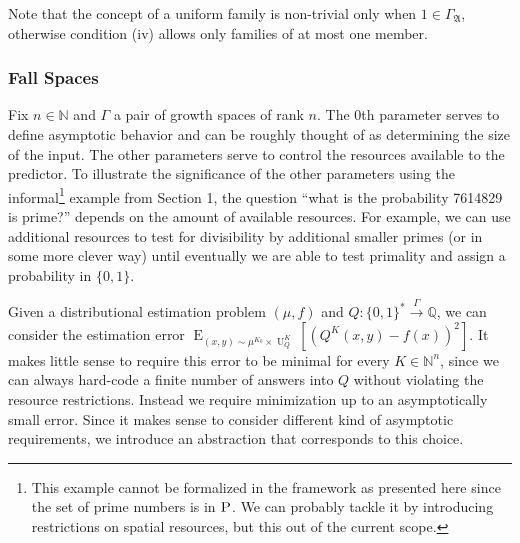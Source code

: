 \documentclass{article}
\numberwithin{equation}{section}
\theoremstyle{definition}
\theoremstyle{plain}
\newcommand{\Bool}{\{0,1\}}
\newcommand{\Words}{{\Bool^*}}
\DeclareMathOperator{\E}{E}
\DeclareMathOperator{\Un}{U}
\newcommand{\Nats}{\mathbb{N}}
\newcommand{\Rats}{\mathbb{Q}}
\newcommand{\GrowA}{\Gamma_{\mathfrak{A}}}
\newcommand{\Scheme}{\xrightarrow{\Gamma}}
\begin{document}
Note that the concept of a uniform family is non-trivial only when $1 \in \GrowA$, otherwise condition (iv) allows only families of at most one member.

\subsubsection{Fall Spaces}

Fix $n \in \Nats$ and $\Gamma$ a pair of growth spaces of rank $n$. The 0th parameter serves to define asymptotic behavior and can be roughly thought of as determining the size of the input. The other parameters serve to control the resources available to the predictor. To illustrate the significance of the other parameters using the informal\footnote{This example cannot be formalized in the framework as presented here since the set of prime numbers is in $\textsc{P}$. We can probably tackle it by introducing restrictions on spatial resources, but this out of the current scope.} example from Section 1, the question \enquote{what is the probability 7614829 is prime?} depends on the amount of available resources. For example, we can use additional resources to test for divisibility by additional smaller primes (or in some more clever way) until eventually we are able to test primality and assign a probability in $\{0,1\}$.

Given a distributional estimation problem $(\mu,f)$ and $Q: \Words \Scheme \Rats$, we can consider the estimation error $\E_{(x,y) \sim \mu^{K_0} \times \Un_Q^K}[(Q^K(x,y) - f(x))^2]$. It makes little sense to require this error to be minimal for every $K \in \Nats^n$, since we can always hard-code a finite number of answers into $Q$ without violating the resource restrictions. Instead we require minimization up to an asymptotically small error. Since it makes sense to consider different kind of asymptotic requirements, we introduce an abstraction that corresponds to this choice.
\end{document}
